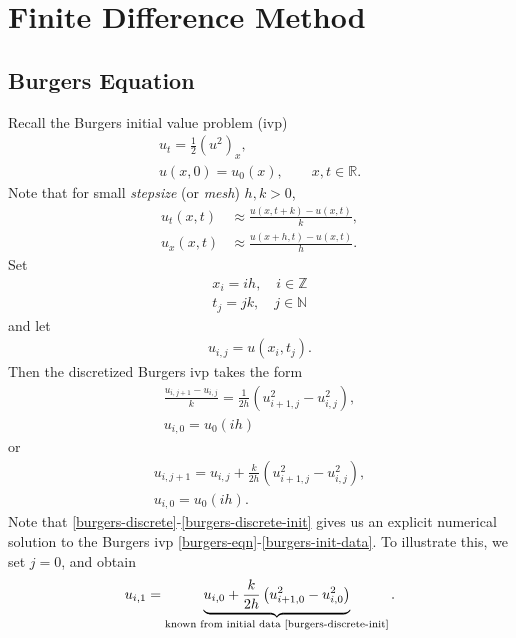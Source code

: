 \documentclass[12pt,reqno]{amsart}
\numberwithin{equation}{section}  %
\newcommand{\rr}{\mathbb{R}}
\begin{document}
\section{Finite Difference Method}
\subsection{Burgers Equation}
Recall the Burgers initial value problem (ivp)
\begin{gather}
\label{burgers-eqn}
u_{t} = \frac{1}{2}(u^{2})_{x},
\\
\label{burgers-init-data}
u(x, 0) = u_{0}(x), \qquad x, t \in \rr.
\end{gather}
Note that for small \emph{stepsize} (or \emph{mesh}) $h, k >0$,
\begin{equation*}
\begin{split}
u_{t}(x,t) &\approx \frac{u(x, t+k) - u(x, t)}{k},
\\
u_{x}(x, t) & \approx \frac{u(x+h, t) - u(x, t)}{h}.
\end{split}
\end{equation*}
Set
\begin{gather*}
x_i = ih, \quad i \in \mathbb{Z}
\\
t_{j}=jk, \quad j \in \mathbb{N}
\end{gather*}
and let
\begin{gather*}
u_{i,j} = u(x_{i}, t_{j}).
\end{gather*}
Then the discretized Burgers ivp takes the form
\begin{gather*}
\frac{u_{i, j+1}- u_{i,j}}{k}=\frac{1}{2h}\left( u_{i+1,j}^{2} -
u_{i,j}^{2} \right),
\\
u_{i,0} = u_{0}(ih)
\end{gather*}
or
\begin{gather}
\label{burgers-discrete}
u_{i, j+1}=u_{i,j} + \frac{k}{2h}\left( u_{i+1,j}^{2} -
u_{i,j}^{2} \right),
\\
\label{burgers-discrete-init}
u_{i,0} = u_{0}(ih).
\end{gather}
Note that \eqref{burgers-discrete}-\eqref{burgers-discrete-init} gives us an
explicit numerical solution to the Burgers ivp
\eqref{burgers-eqn}-\eqref{burgers-init-data}. To illustrate this, we set
$j=0$, and obtain
\begin{equation}
\label{case-j=0}
\begin{split}
u_{i,1} = \underbrace{u_{i,0} + \frac{k}{2h}\left( u_{i+1,0}^{2} -
u_{i,0}^{2} \right)}_{\text{known from initial data
\eqref{burgers-discrete-init}}}.
\end{split}
\end{equation}
\end{document}
